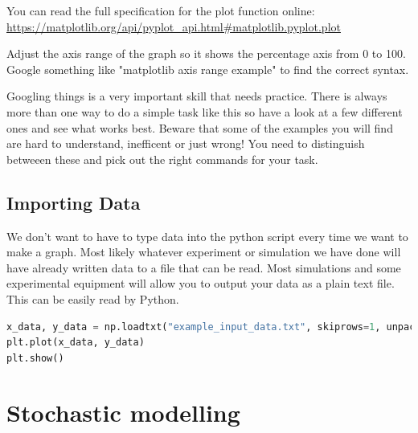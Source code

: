 You can read the full specification for the plot function online: \url{https://matplotlib.org/api/pyplot_api.html#matplotlib.pyplot.plot}
\begin{task}Adjust the axis range of the graph so it shows the percentage axis from 0 to 100. Google something like "matplotlib axis range example" to find the correct syntax.\end{task}
Googling things is a very important skill that needs practice. There is always more than one way to do a simple task like this so have a look at a few different ones and see what works best. Beware that some of the examples you will find are hard to understand, inefficent or just wrong! You need to distinguish betweeen these and pick out the right commands for your task.

	\subsection{Importing Data}
		We don't want to have to type data into the python script every time we want to make a graph. Most likely whatever experiment or simulation we have done will have already written data to a file that can be read. Most simulations and some experimental equipment will allow you to output your data as a plain text file. This can be easily read by Python.
		\begin{lstlisting}[language=Python]
x_data, y_data = np.loadtxt("example_input_data.txt", skiprows=1, unpack=True)
plt.plot(x_data, y_data)
plt.show()\end{lstlisting}

\section{Stochastic modelling}
